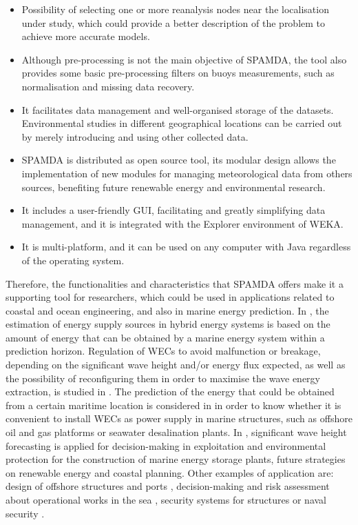 \documentclass[energies,article,submit,moreauthors,pdftex]{Definitions/mdpi}
\begin{document}
\begin{itemize}
			\item Possibility of selecting one or more reanalysis nodes near the localisation under study, which could provide a better description of the problem to achieve more accurate models.
			
			\item Although pre-processing is not the main objective of SPAMDA, the tool also provides some basic pre-processing filters on buoys measurements, such as normalisation and missing data recovery.
			
			\item It facilitates data management and well-organised storage of the datasets. Environmental studies in different geographical locations can be carried out by merely introducing and using other collected data.
			
			\item SPAMDA is distributed as open source tool, its modular design allows the implementation of new modules for managing meteorological data from others sources, benefiting future renewable energy and environmental research.
			
			\item It includes a user-friendly GUI, facilitating and greatly simplifying data management, and it is integrated with the Explorer environment of WEKA.
			
			\item It is multi-platform, and it can be used on any computer with Java regardless of the operating system.
		\end{itemize}
		
		Therefore, the functionalities and characteristics that SPAMDA offers make it a supporting tool for researchers, which could be used in applications related to coastal and ocean engineering, and also in marine energy prediction. In \cite{Kumar2020}, the estimation of energy supply sources in hybrid energy systems is based on the amount of energy that can be obtained by a marine energy system within a prediction horizon. Regulation of WECs to avoid malfunction or breakage, depending on the significant wave height and/or energy flux expected, as well as the possibility of reconfiguring them in order to maximise the wave energy extraction, is studied in \cite{CROWLEY2018159, Abdelkhalik2016}. The prediction of the energy that could be obtained from a certain maritime location is considered in \cite{OLIVEIRAPINTO2019556, FERNANDEZPRIETO2019546} in order to know whether it is convenient to install WECs as power supply in marine structures, such as offshore oil and gas platforms or seawater desalination plants. In \cite{Ali2019}, significant wave height forecasting is applied for decision-making in exploitation and environmental protection for the construction of marine energy storage plants, future strategies on renewable energy and coastal planning. Other examples of application are: design of offshore structures and ports \cite{CHATZIIOANNOU2017126}, decision-making and risk assessment about operational works in the sea \cite{DALGIC2015211}, security systems for structures or naval security \cite{Spaulding2020}.
					
\end{document}

